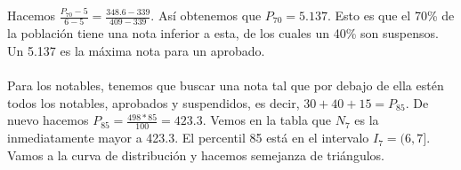     \begin{center}
    \end{center} 
    Hacemos $\frac{P_{70}-5}{6-5}=\frac{348.6-339}{409-339}$. Así obtenemos que $P_{70} = 5.137$. Esto es que el 70\% de la población tiene una nota inferior a esta, de los cuales un 40\% son suspensos. Un 5.137 es la máxima nota para un aprobado. \\ \\
    Para los notables, tenemos que buscar una nota tal que por debajo de ella estén todos los notables, aprobados y suspendidos, es decir, $30+40+15 = P_{85}$. De nuevo hacemos $P_{85}=\frac{498*85}{100}=423.3$. Vemos en la tabla que $N_{7}$ es la inmediatamente mayor a 423.3. El percentil 85 está en el intervalo $I_7 = (6,7]$. Vamos a la curva de distribución y hacemos semejanza de triángulos. \\
    
